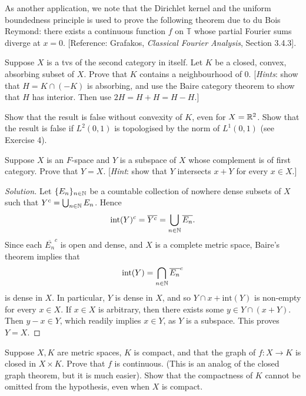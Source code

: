 \begin{remark}
	As another application, we note that the Dirichlet kernel and the uniform boundedness principle is used to prove the following theorem due to du Bois Reymond: there exists a continuous function $f$ on $\mathbb{T}$ whose partial Fourier sums diverge at $x=0$. [Reference: Grafakos, \emph{Classical Fourier Analysis}, Section 3.4.3].
\end{remark}

\begin{exercise}[Ex.\ 2.13]
Suppose $X$ is a tvs of the second category in itself. Let $K$ be a closed, convex, absorbing subset of $X$. Prove that $K$ contains a neighbourhood of 0. [\emph{Hints}: show that $H = K\cap(-K)$ is absorbing, and use the Baire category theorem to show that $H$ has interior. Then use $2H = H+H = H-H$.]

Show that the result is false without convexity of $K$, even for $X = \mathbb{R}^2$. Show that the result is false if $L^2(0,1)$ is topologised by the norm of $L^1(0,1)$ (see Exercise 4).
\end{exercise}

\begin{exercise}[Ex.\ 2.15]
	Suppose $X$ is an $F$-space and $Y$ is a subspace of $X$ whose complement is of first category. Prove that $Y=X$. [\emph{Hint}: show that $Y$ intersects $x+Y$ for every $x\in X$.]
\end{exercise}

\begin{proof}[Solution]
	Let $\{E_n\}_{n\in\mathbb{N}}$ be a countable collection of nowhere dense subsets of $X$ such that $Y^c = \bigcup_{n\in\mathbb{N}} E_n$. Hence
	\begin{equation*}
		\text{int}(Y)^c = \overline{Y^c} = \bigcup_{n\in\mathbb{N}} \overline{E_n}.
	\end{equation*}
	Since each $\overline{E_n}^c$ is open and dense, and $X$ is a complete metric space, Baire's theorem implies that
	\begin{equation*}
		\text{int}(Y) = \bigcap_{n\in\mathbb{N}} \overline{E_n}^c
	\end{equation*}
	is dense in $X$. In particular, $Y$ is dense in $X$, and so $Y \cap x + \text{int}(Y)$ is non-empty for every $x\in X$. If $x\in X$ is arbitrary, then there exists some $y \in Y \cap (x+Y)$. Then $y-x \in Y$, which readily implies $x \in Y$, as $Y$ is a subspace. This proves $Y=X$.
\end{proof}

\begin{exercise}[Ex.\ 2.16]
	Suppose $X, K$ are metric spaces, $K$ is compact, and that the graph of $f:X\to K$ is closed in $X \times K$. Prove that $f$ is continuous. (This is an analog of the closed graph theorem, but it is much easier). Show that the compactness of $K$ cannot be omitted from the hypothesis, even when $X$ is compact.
\end{exercise}

